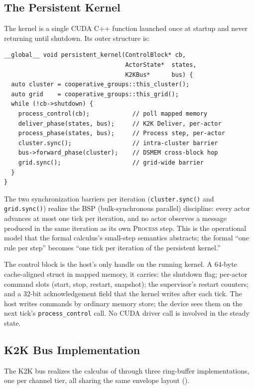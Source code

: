 \subsection{The Persistent Kernel}
\label{sec:implementation:kernel}

The kernel is a single CUDA C++ function launched once at startup
and never returning until shutdown.  Its outer structure is:

\begin{verbatim}
__global__ void persistent_kernel(ControlBlock* cb,
                                  ActorState*  states,
                                  K2KBus*      bus) {
  auto cluster = cooperative_groups::this_cluster();
  auto grid    = cooperative_groups::this_grid();
  while (!cb->shutdown) {
    process_control(cb);            // poll mapped memory
    deliver_phase(states, bus);     // K2K Deliver, per-actor
    process_phase(states, bus);     // Process step, per-actor
    cluster.sync();                 // intra-cluster barrier
    bus->forward_phase(cluster);    // DSMEM cross-block hop
    grid.sync();                    // grid-wide barrier
  }
}
\end{verbatim}

The two synchronization barriers per iteration (\texttt{cluster.sync()}
and \texttt{grid.sync()}) realize the BSP (bulk-synchronous parallel)
discipline: every actor advances at most one tick per iteration,
and no actor observes a message produced in the same iteration as
its own \textsc{Process} step.  This is the operational model that
the formal calculus's small-step semantics abstracts; the formal
``one rule per step'' becomes ``one tick per iteration of the
persistent kernel.''

The control block is the host's only handle on the running kernel.
A 64-byte cache-aligned struct in mapped memory, it carries:
the shutdown flag; per-actor command slots (start, stop, restart,
snapshot); the supervisor's restart counters; and a 32-bit
acknowledgement field that the kernel writes after each tick.  The
host writes commands by ordinary memory store; the device sees them
on the next tick's \texttt{process\_control} call.  No CUDA driver
call is involved in the steady state.

\subsection{K2K Bus Implementation}
\label{sec:implementation:k2k}

The K2K bus realizes the calculus of  through three
ring-buffer implementations, one per channel tier, all sharing the
same envelope layout ().

